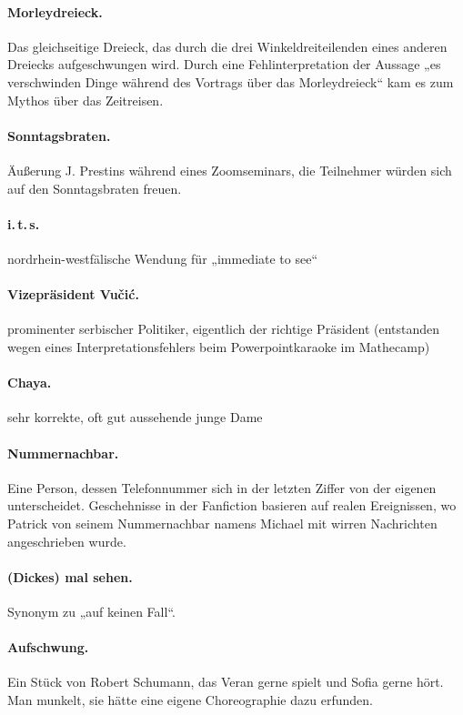 \documentclass[oneside]{memoir}
\begin{document}
\paragraph{Morleydreieck.} Das gleichseitige Dreieck, das durch die drei Winkeldreiteilenden eines anderen Dreiecks aufgeschwungen wird. Durch eine Fehlinterpretation der Aussage „es verschwinden Dinge während des Vortrags  über das Morleydreieck“ kam es zum Mythos über das Zeitreisen.

\paragraph{Sonntagsbraten.} Äußerung J. Prestins während eines Zoomseminars, die Teilnehmer würden sich auf den Sonntagsbraten freuen.

\paragraph{i.\,t.\,s.} nordrhein-westfälische Wendung für „immediate to see“

\paragraph{Vizepräsident Vučić.} prominenter serbischer Politiker, eigentlich der richtige Präsident (entstanden wegen eines Interpretationsfehlers beim Powerpointkaraoke im Mathecamp)

\paragraph{Chaya.} sehr korrekte, oft gut aussehende junge Dame

\paragraph{Nummernachbar.} Eine Person, dessen Telefonnummer sich in der letzten Ziffer von der eigenen unterscheidet. Geschehnisse in der Fanfiction basieren auf realen Ereignissen, wo Patrick von seinem Nummernachbar namens Michael mit wirren Nachrichten angeschrieben wurde.

\paragraph{(Dickes) mal sehen.} Synonym zu „auf keinen Fall“.

\paragraph{Aufschwung.} Ein Stück von Robert Schumann, das Veran gerne spielt und Sofia gerne hört. Man munkelt, sie hätte eine eigene Choreographie dazu erfunden.
\end{document}

